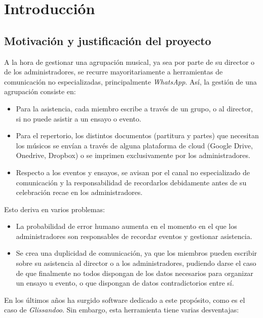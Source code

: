 \chapter{Introducción}

\section{Motivación y justificación del proyecto}


A la hora de gestionar una agrupación musical, ya sea por parte de su director o de los administradores, se recurre mayoritariamente a herramientas de comunicación no especializadas, principalmente \textit{WhatsApp}. Así, la gestión de una agrupación consiste en:

\begin{itemize}
    \item Para la asistencia, cada miembro escribe a través de un grupo, o al director, si no puede asistir a un ensayo o evento.
    \item Para el repertorio, los distintos documentos (partitura y partes) que necesitan los músicos se envían a través de alguna plataforma de cloud (Google Drive, Onedrive, Dropbox) o se imprimen exclusivamente por los administradores.
    \item Respecto a los eventos y ensayos, se avisan por el canal no especializado de comunicación y la responsabilidad de recordarlos debidamente antes de su celebración recae en los administradores.
\end{itemize}


Esto deriva en varios problemas:

\begin{itemize}
    \item La probabilidad de error humano aumenta en el momento en el que los administradores son responsables de recordar eventos y gestionar asistencia.
    \item Se crea una duplicidad de comunicación, ya que los miembros pueden escribir sobre su asistencia al director o a los administradores, pudiendo darse el caso de que finalmente no todos dispongan de los datos necesarios para organizar un ensayo u evento, o que dispongan de datos contradictorios entre sí.
\end{itemize}

En los últimos años ha surgido software dedicado a este propósito, como es el caso de \textit{Glissandoo}. Sin embargo, esta herramienta tiene varias desventajas:

